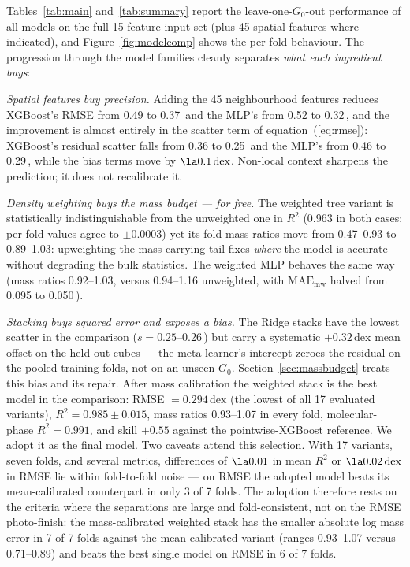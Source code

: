 \documentclass[fleqn,usenatbib]{rasti}
\newcommand{\Gzero}{G_0}
\newcommand{\dex}{\,\text{dex}}
\newcommand{\Rsq}{R^2}
\begin{document}
Tables~\ref{tab:main} and~\ref{tab:summary} report the
leave-one-\(\Gzero\)-out performance of all models on the full 15-feature
input set (plus 45 spatial features where indicated), and
Figure~\ref{fig:modelcomp} shows the per-fold behaviour. The progression
through the model families cleanly separates \emph{what each ingredient
buys}:

\emph{Spatial features buy precision.} Adding the 45 neighbourhood
features reduces XGBoost's RMSE from 0.49 to 0.37\dex{} and the MLP's
from 0.52 to 0.32\dex, and the improvement is almost entirely in the
scatter term of equation~(\ref{eq:rmse}): XGBoost's residual scatter
falls from 0.36 to 0.25\dex{} and the MLP's from 0.46 to 0.29\dex,
while the bias terms move by \(\la 0.1\dex\). Non-local context sharpens
the prediction; it does not recalibrate it.

\emph{Density weighting buys the mass budget --- for free.} The weighted
tree variant is statistically indistinguishable from the unweighted one
in \(\Rsq\) (0.963 in both cases; per-fold values agree to \(\pm 0.0003\))
yet its fold mass ratios move from 0.47--0.93 to 0.89--1.03: upweighting
the mass-carrying tail fixes \emph{where} the model is accurate without
degrading the bulk statistics. The weighted MLP behaves the same way
(mass ratios 0.92--1.03, versus 0.94--1.16 unweighted, with
\(\mathrm{MAE_{mw}}\) halved from 0.095 to 0.050\dex).

\emph{Stacking buys squared error and exposes a bias.} The Ridge stacks
have the lowest scatter in the comparison (\(s = 0.25\)--0.26\dex) but
carry a systematic \(+0.32\dex\) mean offset on the held-out cubes ---
the meta-learner's intercept zeroes the residual on the pooled training
folds, not on an unseen \(\Gzero\). Section~\ref{sec:massbudget} treats
this bias and its repair. After mass calibration the weighted stack is
the best model in the comparison: RMSE \(= 0.294\dex\) (the lowest of all
17 evaluated variants), \(\Rsq = 0.985 \pm 0.015\), mass ratios
0.93--1.07 in every fold, molecular-phase \(\Rsq = 0.991\), and skill
\(+0.55\) against the pointwise-XGBoost reference. We adopt it as the
final model. Two caveats attend this selection. With 17 variants,
seven folds, and several metrics, differences of
\(\la 0.01\) in mean \(\Rsq\) or \(\la 0.02\dex\) in RMSE lie within
fold-to-fold noise --- on RMSE the adopted model beats its
mean-calibrated counterpart in only 3 of 7 folds. The adoption
therefore rests on the criteria where the separations are large and
fold-consistent, not on the RMSE photo-finish: the mass-calibrated
weighted stack has the smaller absolute log mass error in 7 of 7 folds
against the mean-calibrated variant (ranges 0.93--1.07 versus
0.71--0.89) and beats the best single model on RMSE in 6 of 7 folds.
\end{document}
